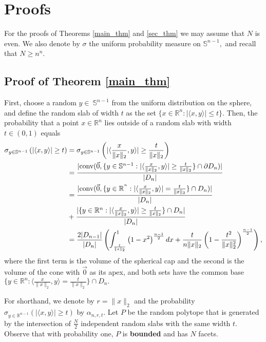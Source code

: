 \documentclass[10pt, twoside, leqno]{article}
\theoremstyle{definition}
\numberwithin{equation}{section}
\newcommand{\R}{\mathbb{R}}
\newcommand\inner[2]{|\langle #1, #2 \rangle|}
\newcommand\inneri[2]{\langle #1, #2 \rangle}
\newcommand\norm[1]{\|#1\|_2}
\begin{document}
\section{Proofs}
	For the proofs of Theorems \ref{main_thm} and \ref{sec_thm} we may assume that $ N $ is even.
	We also denote by $ \sigma $ the uniform probability measure on $ \mathbb{S}^{n-1},$ and recall that $ N \geq n^n.$
	
\subsection{Proof of Theorem \ref{main_thm}}
First, choose a random $ y\in\ \mathbb{S}^{n-1}$ from the uniform distribution on the sphere, and define the random slab of width $t$ as the set $ \{x\in\R^n:\inner{x}{y}\leq t\} $.   
Then, the probability that a point $ x \in\R^n$ lies outside of a random slab with width $ t \in \left(0,1\right)$ equals
\begin{equation}{\label{alphanr}}
\begin{aligned}\sigma_{y\in\mathbb{S}^{n-1}}\left(\inner{x}{y}\geq t\right) & =\sigma_{y\in\mathbb{S}^{n-1}}\left(\inner{\frac{x}{\norm{x}}}{y}\geq\frac{t}{\norm{x}}\right)\\
& =\frac{|\text{conv}(\vec{0},\{y\in\mathbb{S}^{n-1}:\inner{\frac{x}{\norm{x}}}{y}\geq\frac{t}{\norm{x}}\}\cap\partial D_{n})|}{|D_{n}|}\\
& =\frac{|\text{conv}(\vec{0},\{y\in\mathbb{R}^{^{n}}:\inner{\frac{x}{\norm{x}}}{y}=\frac{t}{\norm{x}}\}\cap D_{n})|}{|D_{n}|}\\
&   +\frac{|\{y\in\mathbb{R}^{n}:\inner{\frac{x}{\norm{x}}}{y}\geq\frac{t}{\norm{x}}\}\cap D_{n}|}{|D_{n}|}\\
& =\frac{2|D_{n-1}|}{|D_{n}|}\left(\int_{\frac{t}{\|x\|_{2}}}^{1}\left(1-x^{2}\right)^{\frac{n-1}{2}}dx+\frac{t}{n\norm{x}}\left(1-\frac{t^{2}}{\|x\|_{2}^{2}}\right)^{\frac{n-1}{2}}\right),
\end{aligned}
\end{equation}
where the  first term is the volume of the spherical cap and the second is the volume of the cone with $ \vec{0} $ as its apex, and both sets have the common base  $ \{y\in\mathbb{R}^{n}:\inneri{\frac{x}{\norm{x}}}{y}=\frac{t}{\norm{x}}\} \cap D_n.$ 

For shorthand, we denote by $ r=\|x\|_2 $ and the probability $ \sigma_{y\in \mathbb{R}^{n-1}}\left( \inner{x}{y} \geq t\right) $ by $\alpha_{n,r,t}.$ 
Let $ P $ be the random polytope that is generated by the intersection of $ \frac N2 $ independent random slabs with the same width $ t $. Observe that with probability one, $ P $ is \textbf{bounded} and has $ N $ facets. 
\end{document}
